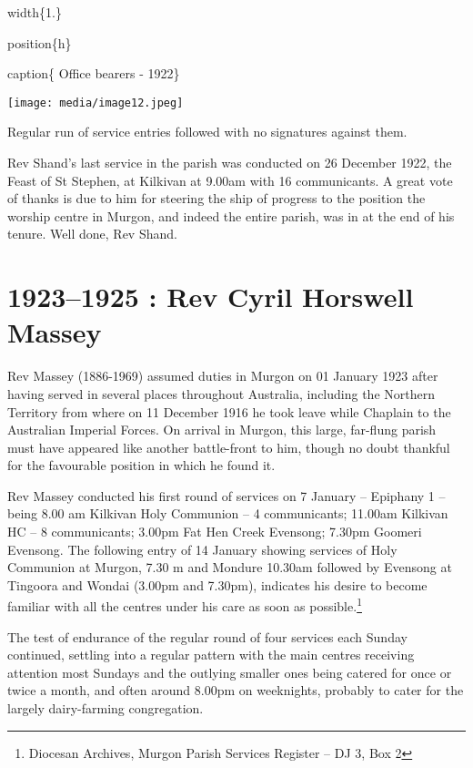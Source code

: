 width\{1.\}

position\{h\}

caption\{ Office bearers - 1922\}

\texttt{[image: media/image12.jpeg]}

Regular run of service entries followed with no signatures against them.

Rev Shand's last service in the parish was conducted on 26 December
1922, the Feast of St Stephen, at Kilkivan at 9.00am with 16
communicants. A great vote of thanks is due to him for steering the ship
of progress to the position the worship centre in Murgon, and indeed the
entire parish, was in at the end of his tenure. Well done, Rev Shand.

\begin{quote}
\end{quote}

\hypertarget{rev-cyril-horswell-massey}{%
\chapter{1923--1925 : Rev Cyril Horswell
Massey}\label{rev-cyril-horswell-massey}}

Rev Massey (1886-1969) assumed duties in Murgon on 01 January 1923 after
having served in several places throughout Australia, including the
Northern Territory from where on 11 December 1916 he took leave while
Chaplain to the Australian Imperial Forces. On arrival in Murgon, this
large, far-flung parish must have appeared like another battle-front to
him, though no doubt thankful for the favourable position in which he
found it.

Rev Massey conducted his first round of services on 7 January --
Epiphany 1 -- being 8.00 am Kilkivan Holy Communion -- 4 communicants;
11.00am Kilkivan HC -- 8 communicants; 3.00pm Fat Hen Creek Evensong;
7.30pm Goomeri Evensong. The following entry of 14 January showing
services of Holy Communion at Murgon, 7.30 m and Mondure 10.30am
followed by Evensong at Tingoora and Wondai (3.00pm and 7.30pm),
indicates his desire to become familiar with all the centres under his
care as soon as possible.\footnote{Diocesan Archives, Murgon Parish
  Services Register -- DJ 3, Box 2}

The test of endurance of the regular round of four services each Sunday
continued, settling into a regular pattern with the main centres
receiving attention most Sundays and the outlying smaller ones being
catered for once or twice a month, and often around 8.00pm on
weeknights, probably to cater for the largely dairy-farming
congregation.

